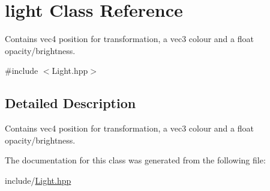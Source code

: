 \hypertarget{classlight}{}\section{light Class Reference}
\label{classlight}


Contains vec4 position for transformation, a vec3 colour and a float opacity/brightness.  




{\ttfamily \#include $<$Light.\+hpp$>$}



\subsection{Detailed Description}
Contains vec4 position for transformation, a vec3 colour and a float opacity/brightness. 

The documentation for this class was generated from the following file\+:\begin{DoxyCompactItemize}
\item 
include/\hyperlink{_light_8hpp}{Light.\+hpp}\end{DoxyCompactItemize}
